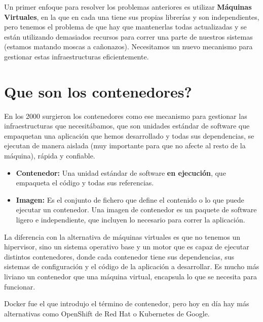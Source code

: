 \documentclass[12pt, twoside, openright]{report} %
\begin{document}
Un primer enfoque para resolver los problemas anteriores es utilizar \textbf{Máquinas Virtuales}, en la que en cada una tiene sus propias librerías y son independientes, pero tenemos el problema de que hay que mantenerlas todas actualizadas y se están utilizando demasiados recursos para correr una parte de nuestros sistemas (estamos matando moscas a cañonazos).
Necesitamos un nuevo mecanismo para gestionar estas infraestructuras eficientemente.

\section{Que son los contenedores?}
En los 2000 surgieron los contenedores como ese mecanismo para gestionar las infraestructuras que necesitábamos, que son unidades estándar de software que empaquetan una aplicación que hemos desarrollado y todas sus dependencias, se ejecutan de manera aislada (muy importante para que no afecte al resto de la máquina), rápida y confiable.

\begin{itemize}
	\item \textbf{Contenedor:} Una unidad estándar de software \textbf{en ejecución}, que empaqueta el código y todas sus referencias.
	\item \textbf{Imagen:} Es el conjunto de fichero que define el contenido o lo que puede ejecutar un contenedor.
	      Una imagen de contenedor es un paquete de software ligero e independiente, que incluyen lo necesario para correr la aplicación.
\end{itemize}

La diferencia con la alternativa de máquinas virtuales es que no tenemos un hipervisor, sino un sistema operativo base y un motor que es capaz de ejecutar distintos contenedores, donde cada contenedor tiene sus dependencias, sus sistemas de configuración y el código de la aplicación a desarrollar. Es mucho más liviano un contenedor que una máquina virtual, encapsula lo que se necesita para funcionar.

Docker fue el que introdujo el término de contenedor, pero hoy en día hay más alternativas como OpenShift de Red Hat o Kubernetes de Google.
\end{document}
